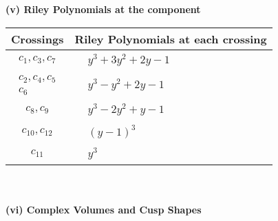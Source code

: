 \documentclass[1p]{elsarticle_modified}
\theoremstyle{definition}
\begin{document}
\newpage\renewcommand{\arraystretch}{1}
\flushleft \textbf{(v) Riley Polynomials at the component}\newline \\
\begin{tabular}{m{50pt}|m{274pt}}
Crossings & \hspace{64pt}Riley Polynomials at each crossing \\
\hline $$\begin{aligned}c_{1},c_{3},c_{7}\end{aligned}$$&$\begin{aligned}
&y^3+3 y^2+2 y-1
\end{aligned}$\\
\hline $$\begin{aligned}c_{2},c_{4},c_{5}\\c_{6}\end{aligned}$$&$\begin{aligned}
&y^3- y^2+2 y-1
\end{aligned}$\\
\hline $$\begin{aligned}c_{8},c_{9}\end{aligned}$$&$\begin{aligned}
&y^3-2 y^2+y-1
\end{aligned}$\\
\hline $$\begin{aligned}c_{10},c_{12}\end{aligned}$$&$\begin{aligned}
&(y-1)^3
\end{aligned}$\\
\hline $$\begin{aligned}c_{11}\end{aligned}$$&$\begin{aligned}
&y^3
\end{aligned}$\\
\hline
\end{tabular}\\~\\
\newpage\flushleft \textbf{(vi) Complex Volumes and Cusp Shapes}
\end{document}
